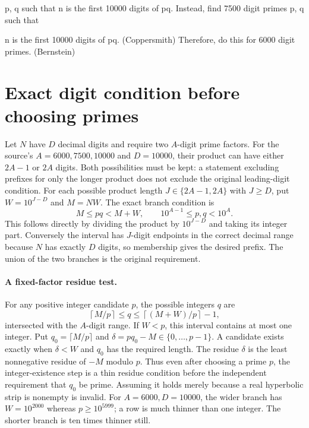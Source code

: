 \documentclass[11pt]{article}
\begin{document}
p, q such that n is the first 10000 digits of pq. Instead, find 7500 digit primes p, q such that

n is the first 10000 digits of pq. (Coppersmith) Therefore, do this for 6000 digit primes. (Bernstein)

\section{Exact digit condition before choosing primes}
Let $N$ have $D$ decimal digits and require two $A$-digit prime factors.
For the source's $A=6000,7500,10000$ and $D=10000$, their product
can have either $2A-1$ or $2A$ digits. Both possibilities must be
kept: a statement excluding prefixes for only the longer product does
not exclude the original leading-digit condition.
For each possible product length $J\in\{2A-1,2A\}$ with $J\ge D$,
put $W=10^{J-D}$ and $M=NW$. The exact branch condition is
\[
M\le pq<M+W,\qquad 10^{A-1}\le p,q<10^A.
\]
This follows directly by dividing the product by $10^{J-D}$ and
taking its integer part. Conversely the interval has $J$-digit
endpoints in the correct decimal range because $N$ has exactly $D$
digits, so membership gives the desired prefix. The union of the two
branches is the original requirement.

\paragraph{A fixed-factor residue test.}
For any positive integer candidate $p$, the possible integers $q$ are
\[
\left\lceil M/p\right\rceil\le q\le
\left\lceil(M+W)/p\right\rceil-1,
\]
intersected with the $A$-digit range. If $W<p$, this interval contains
at most one integer. Put $q_0=\lceil M/p\rceil$ and
$\delta=pq_0-M\in\{0,\ldots,p-1\}$. A candidate exists exactly when
$\delta<W$ and $q_0$ has the required length. The residue $\delta$
is the least nonnegative residue of $-M$ modulo $p$.
Thus even after choosing a prime $p$, the integer-existence step is a
thin residue condition before the independent requirement that $q_0$
be prime. Assuming it holds merely because a real hyperbolic strip is
nonempty is invalid. For $A=6000,D=10000$, the wider branch has
$W=10^{2000}$ whereas $p\ge10^{5999}$; a row is much thinner than
one integer. The shorter branch is ten times thinner still.
\end{document}
